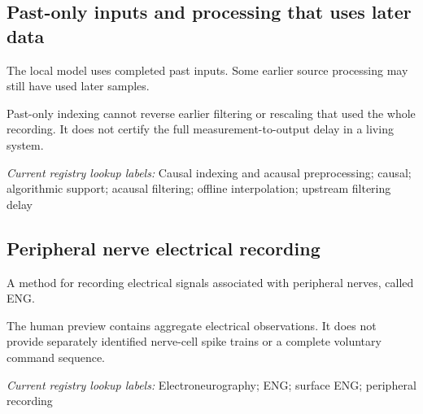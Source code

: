 \begin{samepage}
\subsection*{Past-only inputs and processing that uses later data}
\noindent The local model uses completed past inputs. Some earlier source processing may still have used later samples.\par
\end{samepage}
\begin{samepage}
\noindent Past-only indexing cannot reverse earlier filtering or rescaling that used the whole recording. It does not certify the full measurement-to-output delay in a living system.\par\nopagebreak[4]

\end{samepage}


\noindent\textit{Current registry lookup labels:} Causal indexing and acausal preprocessing; causal; algorithmic support; acausal filtering; offline interpolation; upstream filtering delay\par

\begin{samepage}
\subsection*{Peripheral nerve electrical recording}
\noindent A method for recording electrical signals associated with peripheral nerves, called ENG.\par
\end{samepage}
\begin{samepage}
\noindent The human preview contains aggregate electrical observations. It does not provide separately identified nerve-cell spike trains or a complete voluntary command sequence.\par\nopagebreak[4]

\end{samepage}


\noindent\textit{Current registry lookup labels:} Electroneurography; ENG; surface ENG; peripheral recording\par

